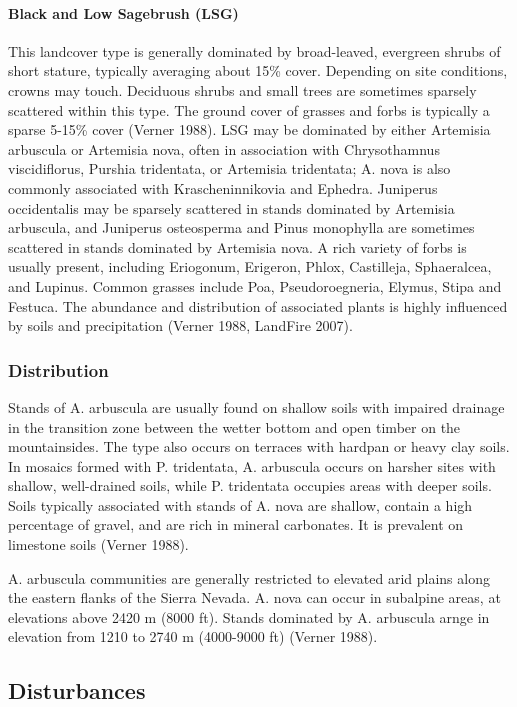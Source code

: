 \paragraph{Black and Low Sagebrush (LSG)}	This landcover type is generally dominated by broad-leaved, evergreen shrubs of short stature, typically averaging about 15\% cover. Depending on site conditions, crowns may touch. Deciduous shrubs and small trees are sometimes sparsely scattered within this type. The ground cover of grasses and forbs is typically a sparse 5-15\% cover (Verner 1988). LSG may be dominated by either Artemisia arbuscula or Artemisia nova, often in association with Chrysothamnus viscidiflorus, Purshia tridentata, or Artemisia tridentata; A. nova is also commonly associated with Krascheninnikovia and Ephedra. Juniperus occidentalis may be sparsely scattered in stands dominated by Artemisia arbuscula, and Juniperus osteosperma and Pinus monophylla are sometimes scattered in stands dominated by Artemisia nova. A rich variety of forbs is usually present, including Eriogonum, Erigeron, Phlox, Castilleja, Sphaeralcea, and Lupinus. Common grasses include Poa, Pseudoroegneria, Elymus, Stipa and Festuca. The abundance and distribution of associated plants is highly influenced by soils and precipitation (Verner 1988, LandFire 2007).

\subsubsection{Distribution}
Stands of A. arbuscula are usually found on shallow soils with impaired drainage in the transition zone between the wetter bottom and open timber on the mountainsides. The type also occurs on terraces with hardpan or heavy clay soils. In mosaics formed with P. tridentata, A. arbuscula occurs on harsher sites with shallow, well-drained soils, while P. tridentata occupies areas with deeper soils. Soils typically associated with stands of A. nova are shallow, contain a high percentage of gravel, and are rich in mineral carbonates. It is prevalent on limestone soils (Verner 1988).

A. arbuscula communities are generally restricted to elevated arid plains along the eastern flanks of the Sierra Nevada. A. nova can occur in subalpine areas, at elevations above 2420 m (8000 ft). Stands dominated by A. arbuscula arnge in elevation from 1210 to 2740 m (4000-9000 ft) (Verner 1988).


\subsection{Disturbances}

